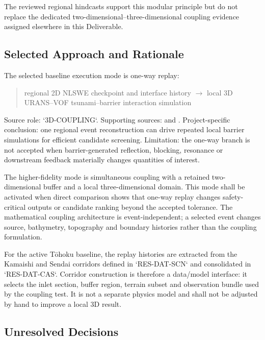 The reviewed regional hindcasts support this modular principle but do
not replace the dedicated two-dimensional--three-dimensional coupling
evidence assigned elsewhere in this Deliverable.

\subsection{Selected Approach and Rationale}
\label{sec:res-mod-mul-selected-approach}


The selected baseline execution mode is one-way replay:

\begin{quote}
  regional 2D NLSWE checkpoint and interface history
  $\rightarrow$
  local 3D URANS--VOF tsunami--barrier interaction simulation
\end{quote}

Source role: `3D-COUPLING`. Supporting sources:
\textcite{takase2016hybrid} and \textcite{romano2025coupling}.
Project-specific conclusion: one regional event reconstruction can
drive repeated local barrier simulations for efficient candidate
screening. Limitation: the one-way branch is not accepted when
barrier-generated reflection, blocking, resonance or downstream
feedback materially changes quantities of interest.

The higher-fidelity mode is simultaneous coupling with a retained
two-dimensional buffer and a local three-dimensional domain. This mode
shall be activated when direct comparison shows that one-way replay
changes safety-critical outputs or candidate ranking beyond the
accepted tolerance. The mathematical coupling architecture is
event-independent; a selected event changes source, bathymetry,
topography and boundary histories rather than the coupling formulation.

For the active Tōhoku baseline, the replay histories are extracted
from the Kamaishi and Sendai corridors defined in `RES-DAT-SCN` and
consolidated in `RES-DAT-CAS`. Corridor construction is therefore a
data/model interface: it selects the inlet section, buffer region,
terrain subset and observation bundle used by the coupling test. It is
not a separate physics model and shall not be adjusted by hand to
improve a local 3D result.

\subsection{Unresolved Decisions}
\label{sec:res-mod-mul-unresolved-decisions}

